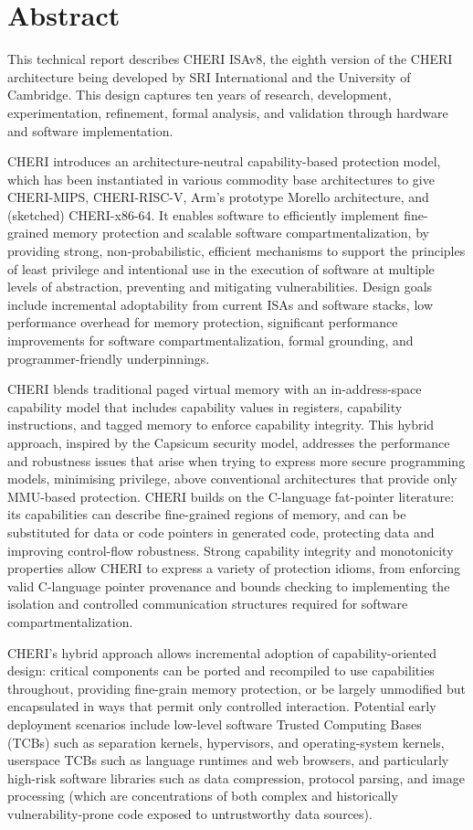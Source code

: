 \section*{Abstract}

This technical report describes CHERI ISAv8, the eighth version of the
CHERI architecture
being developed by SRI International and the University of Cambridge.
This design captures ten years of research, development, experimentation,
refinement, formal analysis, and validation through hardware and software
implementation.

CHERI introduces an architecture-neutral capability-based protection
model, which has been instantiated in various commodity base architectures
to give CHERI-MIPS,
CHERI-RISC-V, Arm's prototype Morello architecture, and (sketched)
CHERI-x86-64.
It enables software
to efficiently implement fine-grained memory protection and scalable software
compartmentalization, by providing strong, non-probabilistic, efficient
mechanisms to support the principles of least privilege and intentional use
in the execution of software at multiple levels of abstraction, preventing and
mitigating vulnerabilities.
Design goals include incremental adoptability from current ISAs and
software stacks, low performance overhead for memory protection, significant
performance improvements for software compartmentalization, formal grounding,
and programmer-friendly underpinnings.

CHERI blends traditional paged virtual memory with an
in-address-space capability model that includes capability values in registers,
capability instructions, and tagged memory to enforce capability integrity.
This hybrid approach, inspired by the Capsicum security model, addresses the performance and robustness issues that arise
when trying to express more secure programming models, minimising
privilege, above conventional architectures that provide only
MMU-based protection.
CHERI builds on the C-language fat-pointer literature: its capabilities can
describe fine-grained regions of memory, and can be substituted for data or
code pointers in generated code, protecting data and improving
control-flow robustness.
Strong capability integrity and monotonicity properties allow CHERI
to express a variety of protection idioms, from enforcing valid C-language
pointer provenance and bounds checking to implementing the isolation and
controlled communication structures required for software
compartmentalization.

CHERI's hybrid approach allows incremental adoption of capability-oriented design:
critical components can be ported and recompiled to use capabilities throughout,
providing fine-grain memory protection, or be largely unmodified but encapsulated in ways that permit
only controlled interaction. 
Potential early deployment scenarios include low-level software Trusted Computing
Bases (TCBs) such as separation kernels, hypervisors, and operating-system
kernels,  userspace TCBs such as language runtimes and web browsers, 
and particularly high-risk
software libraries such as data compression, protocol parsing, and image
processing (which are concentrations of both complex and historically
vulnerability-prone code exposed to untrustworthy data sources).


